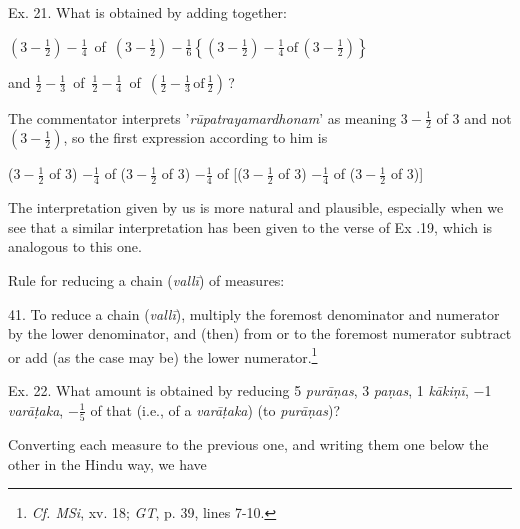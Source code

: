 \documentclass[10pt, openany]{book}
\begin{document}
{{{{{{{{{{{{{{{{{{{{\begin{sloppypar}
 Ex. 21. What is obtained by adding together:
\vspace{3mm}

 \hspace{1cm} $\left(3 - \frac{1}{2}\right) - \frac{1}{4}$ \,of\, $\left(3 - \frac{1}{2}\right) - \frac{1}{6} \left\lbrace \left(3 - \frac{1}{2}\right) - \frac{1}{4} \,\textrm{of}\, \left(3 - \frac{1}{2}\right)\right\rbrace$
\vspace{2mm}

and \hspace{5mm} $\frac{1}{2} - \frac{1}{3}$ \,of\, $\frac{1}{2} - \frac{1}{4}$ \,of\, $\left(\frac{1}{2} - \frac{1}{3} \,\textrm{of}\, \frac{1}{2}\right)$\,?

\newpage

{\small The commentator interprets '\textit{rūpatrayamardhonam}' as meaning
$3- \frac{1}{2}$ of 3 and not $\left(3 - \frac{1}{2}\right)$, so the first expression according to him
is
\vspace{3mm}

\hspace{8mm} ($3- \frac{1}{2}$ of 3) $- \frac{1}{4}$ of ($3- \frac{1}{2}$ of 3) $- \frac{1}{4}$ of [($3- \frac{1}{2}$ of 3) $- \frac{1}{4}$ of
($3- \frac{1}{2}$ of 3)]
\vspace{3mm}

 The interpretation given by us is more natural and plausible,
especially when we see that a similar interpretation has been given to
the verse of Ex .19, which is analogous to this one.}
\vspace{-0.01mm}

Rule for reducing a chain (\textit{vallī}) of measures:
\vspace{3mm}

41. To reduce a chain (\textit{vallī}), multiply the foremost
denominator and numerator by the lower denominator, and
(then) from or to the foremost numerator subtract or add
(as the case may be) the lower numerator.\renewcommand{\thefootnote}{1}\footnote{\en  \textit{Cf. MSi}, xv. 18; \textit{GT}, p. 39, lines 7-10.}
\vspace{3mm}

Ex. 22. What amount is obtained by reducing
5  \textit{purāṇas}, 3  \textit{paṇas}, 1  \textit{kākiṇī}, $-$1 \textit{varāṭaka}, $- \frac{1}{5}$ of that (i.e., of a  \textit{varāṭaka}) (to  \textit{purāṇas})?
\vspace{3mm}

{\small Converting each measure to the previous one, and writing them one
below the other in the Hindu way, we have
\vspace{3mm}

}
\end{sloppypar}}}}}}}}}}}}}}}}}}}}}
\end{document}
